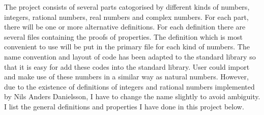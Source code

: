 \documentclass{article}
\theoremstyle{definition}
\begin{document}
The project consists of several parts catogorised by different kinds of numbers, integers, rational numbers, real numbers and complex numbers. For each part, there will be one or more alternative definitions. For each definition there are
several files containing the proofs of properties. The definition which is most convenient to use will be put in the primary file for each kind of numbers. The name convention and layout of code has been adapted to the standard library so that it is easy for add these codes into the standard library. User could import and make use of these numbers in a similar way as natural numbers. However, due to the existence of definitions of integers and rational numbers implemented by Nils Anders Danielsson, I have to change the name slightly to avoid ambiguity. I list the general definitions and properties I have done in this project below.
\end{document}
